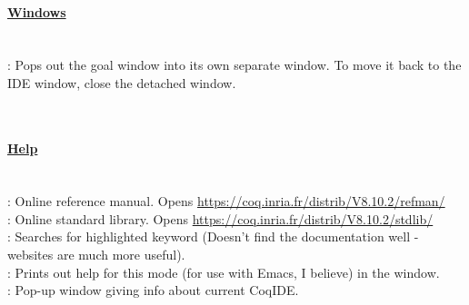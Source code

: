 	
~\\
\paragraph{\underline{Windows}}
~\\
 : Pops out the goal window into its own separate window. 
	To move it back to the IDE window, close the detached window. 




	
~\\
\paragraph{\underline{Help}}
~\\
 : Online reference manual. Opens \url{https://coq.inria.fr/distrib/V8.10.2/refman/}
\\ 
 : Online standard library. Opens \url{https://coq.inria.fr/distrib/V8.10.2/stdlib/}
\\
 : Searches for highlighted keyword 
	(Doesn't find the documentation well - websites are much more useful). 
\\
 : Prints out help for this mode (for use with Emacs, I believe) in the  window.
\\ 
 : Pop-up window giving info about current CoqIDE.











